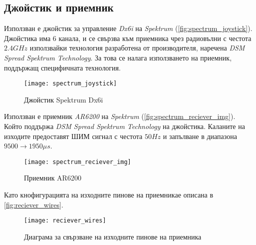 \subsection{Джойстик и приемник}

Използван е джойстик за управление \textit{Dx6i} на \textit{Spektrum} (\autoref{fig:spectrum_joystick}).
Джойстика има 6 канала,
и се свързва към  приемника чрез радиовълни с честота \(2.4GHz\) използвайки
технология разработена от производителя, наречена \textit{DSM Spread Spektrum Technology}.
За това се налага използването на приемник, поддържащ специфичната технология.

\begin{figure}[htpb!]
    \centering
    \texttt{[image: spectrum\_joystick]}
    \caption{Джойстик Spektrum Dx6i}
    \label{fig:spectrum_joystick}
\end{figure}

Използван е приемник \textit{AR6200} на \textit{Spektrum} (\autoref{fig:spectrum_reciever_img}).
Който поддържа \textit{DSM Spread Spektrum Technology} на джойстика.
Каланите на изходите предоставят ШИМ сигнал с честота \(50Hz\) и запълване в диапазона \(9500\to1950 \mu s\).


\begin{figure}[htpb!]
    \centering
    \texttt{[image: spectrum\_reciever\_img]}
    \caption{Приемник AR6200}
    \label{fig:spectrum_reciever_img}
\end{figure}

Като кнофигурацията на изходните пинове на приемникае описана в \autoref{fig:reciever_wires}.

\begin{figure}[htpb!]
    \centering
    \texttt{[image: reciever\_wires]}
    \caption{Диаграма за свързване на изходните пинове на приемника}
    \label{fig:reciever_wires}
\end{figure}



\FloatBarrier
